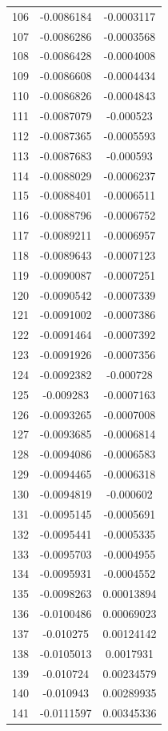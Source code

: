 \documentclass[a4paper, 11pt, oneside]{report}
\begin{document}
{\begin{longtable}{|c|c|c|}
106 & -0.0086184 & -0.0003117 \\
107 & -0.0086286 & -0.0003568 \\
108 & -0.0086428 & -0.0004008 \\
109 & -0.0086608 & -0.0004434 \\
110 & -0.0086826 & -0.0004843 \\
111 & -0.0087079 & -0.000523  \\
112 & -0.0087365 & -0.0005593 \\
113 & -0.0087683 & -0.000593  \\
114 & -0.0088029 & -0.0006237 \\
115 & -0.0088401 & -0.0006511 \\
116 & -0.0088796 & -0.0006752 \\
117 & -0.0089211 & -0.0006957 \\
118 & -0.0089643 & -0.0007123 \\
119 & -0.0090087 & -0.0007251 \\
120 & -0.0090542 & -0.0007339 \\
121 & -0.0091002 & -0.0007386 \\
122 & -0.0091464 & -0.0007392 \\
123 & -0.0091926 & -0.0007356 \\
124 & -0.0092382 & -0.000728  \\
125 & -0.009283  & -0.0007163 \\
126 & -0.0093265 & -0.0007008 \\
127 & -0.0093685 & -0.0006814 \\
128 & -0.0094086 & -0.0006583 \\
129 & -0.0094465 & -0.0006318 \\
130 & -0.0094819 & -0.000602  \\
131 & -0.0095145 & -0.0005691 \\
132 & -0.0095441 & -0.0005335 \\
133 & -0.0095703 & -0.0004955 \\
134 & -0.0095931 & -0.0004552 \\
135 & -0.0098263 & 0.00013894 \\
136 & -0.0100486 & 0.00069023 \\
137 & -0.010275  & 0.00124142 \\
138 & -0.0105013 & 0.0017931  \\
139 & -0.010724  & 0.00234579 \\
140 & -0.010943  & 0.00289935 \\
141 & -0.0111597 & 0.00345336 \\

\end{longtable}}
\end{document}
